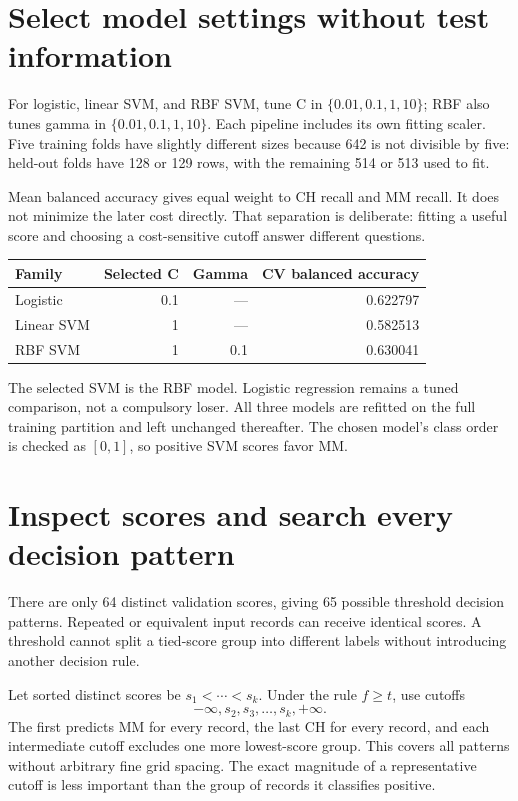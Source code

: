 \section{Select model settings without test information}
For logistic, linear SVM, and RBF SVM, tune C in $\{0.01,0.1,1,10\}$;
RBF also tunes gamma in $\{0.01,0.1,1,10\}$. Each pipeline includes its own fitting scaler.
Five training folds have slightly different sizes because 642 is not divisible by five:
held-out folds have 128 or 129 rows, with the remaining 514 or 513 used to fit.

Mean balanced accuracy gives equal weight to CH recall and MM recall. It does not minimize the later cost directly.
That separation is deliberate: fitting a useful score and choosing a cost-sensitive cutoff answer different questions.
\begin{center}\begin{tabular}{lrrr}\toprule
Family&Selected C&Gamma&CV balanced accuracy\\\midrule
Logistic&0.1&---&0.622797\\
Linear SVM&1&---&0.582513\\
RBF SVM&1&0.1&0.630041\\\bottomrule\end{tabular}\end{center}
The selected SVM is the RBF model. Logistic regression remains a tuned comparison, not a compulsory loser.
All three models are refitted on the full training partition and left unchanged thereafter.
The chosen model's class order is checked as $[0,1]$, so positive SVM scores favor MM.

\section{Inspect scores and search every decision pattern}
There are only 64 distinct validation scores, giving 65 possible threshold decision patterns.
Repeated or equivalent input records can receive identical scores. A threshold cannot split a tied-score group
into different labels without introducing another decision rule.

Let sorted distinct scores be $s_1<\cdots<s_k$. Under the rule $f\ge t$, use cutoffs
\[-\infty,s_2,s_3,\ldots,s_k,+\infty.\]
The first predicts MM for every record, the last CH for every record, and each intermediate cutoff excludes
one more lowest-score group. This covers all patterns without arbitrary fine grid spacing.
The exact magnitude of a representative cutoff is less important than the group of records it classifies positive.

